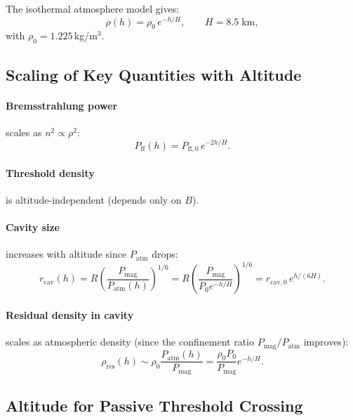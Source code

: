 \documentclass[12pt,a4paper]{article}
\begin{document}
The isothermal atmosphere model gives:
\begin{equation}
  \rho(h) = \rho_0 \, e^{-h/H}, \qquad H = 8.5 \; \text{km},
\end{equation}
with $\rho_0 = 1.225$\,kg/m$^3$.

\subsection{Scaling of Key Quantities with Altitude}

\paragraph{Bremsstrahlung power} scales as $n^2 \propto \rho^2$:
\begin{equation}
  P_{\text{ff}}(h) = P_{\text{ff},0} \, e^{-2h/H}.
\end{equation}

\paragraph{Threshold density} is altitude-independent (depends only on $B$).

\paragraph{Cavity size} increases with altitude since $P_{\text{atm}}$ drops:
\begin{equation}
  r_{\text{cav}}(h) = R \left(\frac{P_{\text{mag}}}{P_{\text{atm}}(h)}\right)^{1/6}
    = R \left(\frac{P_{\text{mag}}}{P_0 e^{-h/H}}\right)^{1/6}
    = r_{\text{cav},0} \, e^{h/(6H)}.
\end{equation}

\paragraph{Residual density in cavity} scales as atmospheric density (since the
confinement ratio $P_{\text{mag}}/P_{\text{atm}}$ improves):
\begin{equation}
  \rho_{\text{res}}(h) \sim \rho_0 \frac{P_{\text{atm}}(h)}{P_{\text{mag}}} = \frac{\rho_0 P_0}{P_{\text{mag}}} e^{-h/H}.
\end{equation}

\subsection{Altitude for Passive Threshold Crossing}
\end{document}
